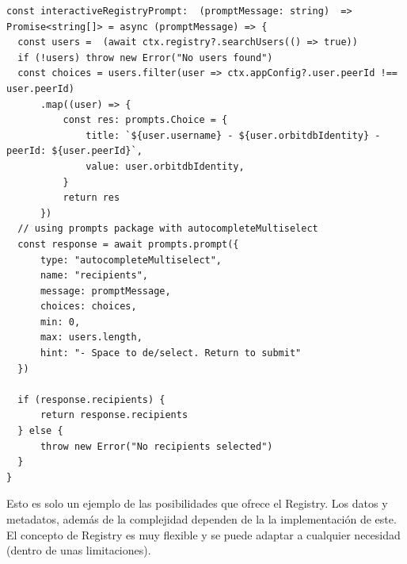\begin{verbatim}
const interactiveRegistryPrompt:  (promptMessage: string)  => Promise<string[]> = async (promptMessage) => {
  const users =  (await ctx.registry?.searchUsers(() => true))
  if (!users) throw new Error("No users found")
  const choices = users.filter(user => ctx.appConfig?.user.peerId !== user.peerId)
      .map((user) => {
          const res: prompts.Choice = {
              title: `${user.username} - ${user.orbitdbIdentity} - peerId: ${user.peerId}`,
              value: user.orbitdbIdentity,
          }
          return res
      })
  // using prompts package with autocompleteMultiselect
  const response = await prompts.prompt({
      type: "autocompleteMultiselect",
      name: "recipients",
      message: promptMessage,
      choices: choices,
      min: 0,
      max: users.length,
      hint: "- Space to de/select. Return to submit"
  })

  if (response.recipients) {
      return response.recipients
  } else {
      throw new Error("No recipients selected")
  }
}
\end{verbatim}

Esto es solo un ejemplo de las posibilidades que ofrece el Registry. Los datos y metadatos, además de la complejidad dependen de la la implementación
de este. El concepto de Registry es muy flexible y se puede adaptar a cualquier necesidad (dentro de unas limitaciones).


